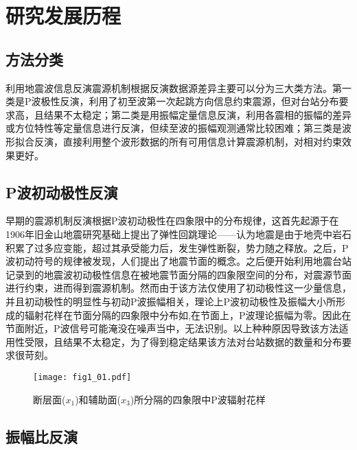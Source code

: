 

\section{研究发展历程}

\subsection{方法分类}

利用地震波信息反演震源机制根据反演数据源差异主要可以分为三大类方法。第一类是P波极性反演，利用了初至波第一次起跳方向信息约束震源，但对台站分布要求高，且结果不太稳定；第二类是用振幅定量信息反演，利用各震相的振幅的差异或方位特性等定量信息进行反演，但续至波的振幅观测通常比较困难；第三类是波形拟合反演，直接利用整个波形数据的所有可用信息计算震源机制，对相对约束效果更好。

\subsection{P波初动极性反演}

早期的震源机制反演根据P波初动极性在四象限中的分布规律\citep{Balakina1961}，这首先起源于\citep{Reid1910}在1906年旧金山地震研究\citep{Milne1910}基础上提出了弹性回跳理论——认为地震是由于地壳中岩石积累了过多应变能，超过其承受能力后，发生弹性断裂，势力随之释放。之后，P波初动符号的规律被发现\cite{Nakano1923}，人们提出了地震节面的概念。之后便开始利用地震台站记录到的地震波初动极性信息在被地震节面分隔的四象限空间的分布，对震源节面进行约束，进而得到震源机制。然而由于该方法仅使用了初动极性这一少量信息，并且初动极性的明显性与初动P波振幅相关，理论上P波初动极性及振幅大小所形成的辐射花样在节面分隔的四象限中分布如,在节面上，P波理论振幅为零。因此在节面附近，P波信号可能淹没在噪声当中，无法识别。以上种种原因导致该方法适用性受限，且结果不太稳定，为了得到稳定结果该方法对台站数据的数量和分布要求很苛刻。
\begin{figure}
\centering
  \texttt{[image: fig1\_01.pdf]} 
  \caption{断层面($x_1$)和辅助面($x_3$)所分隔的四象限中P波辐射花样\citep{Stein2003}}
  \label{fig1_01}
\end{figure}

\subsection{振幅比反演}

